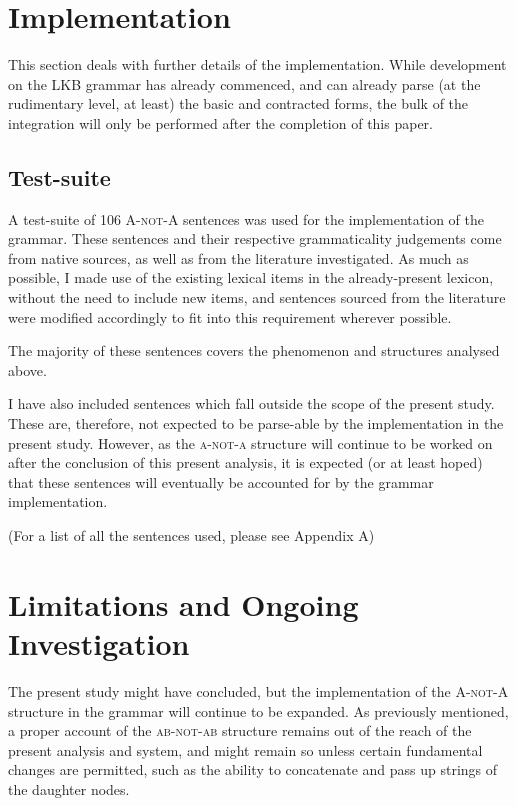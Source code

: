\documentclass[12pt, UTF8]{article}
\begin{document}
\newpage

\section{Implementation}
This section deals with further details of the implementation. While development on the LKB grammar has already commenced, and can already parse (at the rudimentary level, at least) the basic and contracted forms, the bulk of the integration will only be performed after the completion of this paper.

\subsection{Test-suite}

A test-suite of 106 \textsc{A-not-A} sentences was used for the implementation of the grammar. These sentences and their respective grammaticality judgements come from native sources, as well as from the literature investigated. As much as possible, I made use of the existing lexical items in the already-present lexicon, without the need to include new items, and sentences sourced from the literature were modified accordingly to fit into this requirement wherever possible.

The majority of these sentences covers the phenomenon and structures analysed above.

I have also included sentences which fall outside the scope of the present study. These are, therefore, not expected to be parse-able by the implementation in the present study. However, as the \textsc{a-not-a} structure will continue to be worked on after the conclusion of this present analysis, it is expected (or at least hoped) that these sentences will eventually be accounted for by the grammar implementation.

(For a list of all the sentences used, please see Appendix A)

\newpage

\section{Limitations and Ongoing Investigation}

The present study might have concluded, but the implementation of the \textsc{A-not-A} structure in the grammar will continue to be expanded. As previously mentioned, a proper account of the \textsc{ab-not-ab} structure remains out of the reach of the present analysis and system, and might remain so unless certain fundamental changes are permitted, such as the ability to concatenate and pass up strings of the daughter nodes.
\end{document}
